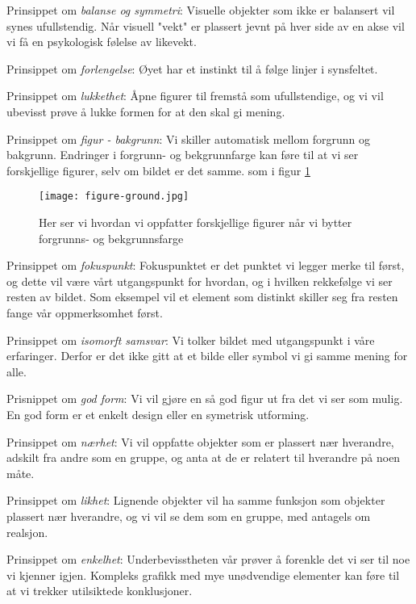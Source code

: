 \noindent
Prinsippet om \emph{balanse og symmetri}: Visuelle objekter som ikke er balansert vil synes ufullstendig. Når visuell "vekt" er plassert jevnt på hver side av en akse vil vi få en psykologisk følelse av likevekt.

\noindent
Prinsippet om \emph{forlengelse}: Øyet har et instinkt til å følge linjer i synsfeltet.

\noindent
Prinsippet om \emph{lukkethet}: Åpne figurer til fremstå som ufullstendige, og vi vil ubevisst prøve å lukke formen for at den skal gi mening.

\noindent
Prinsippet om \emph{figur - bakgrunn}: Vi skiller automatisk mellom forgrunn og bakgrunn. Endringer i forgrunn- og bekgrunnfarge kan føre til at vi ser forskjellige figurer, selv om bildet er det samme. som i figur \ref{forgrunn_bakgrunn}

\begin{figure}
\centering
\texttt{[image: figure-ground.jpg]}
\caption{Her ser vi hvordan vi oppfatter forskjellige figurer når vi bytter forgrunns- og bekgrunnsfarge}
\label{forgrunn_bakgrunn}
\end{figure}

\noindent
Prinsippet om \emph{fokuspunkt}: Fokuspunktet er det punktet vi legger merke til først, og dette vil være vårt utgangspunkt for hvordan, og i hvilken rekkefølge vi ser resten av bildet. Som eksempel vil et element som distinkt skiller seg fra resten fange vår oppmerksomhet først.

\noindent
Prinsippet om \emph{isomorft samsvar}: Vi tolker bildet med utgangspunkt i våre erfaringer. Derfor er det ikke gitt at et bilde eller symbol vi gi samme mening for alle.

\noindent
Prisnippet om \emph{god form}: Vi vil gjøre en så god figur ut fra det vi ser som mulig. En god form er et enkelt design eller en symetrisk utforming.

\noindent
Prinsippet om \emph{nærhet}: Vi vil oppfatte objekter som er plassert nær hverandre, adskilt fra andre som en gruppe, og anta at de er relatert til hverandre på noen måte.

\noindent
Prinsippet om \emph{likhet}: Lignende objekter vil ha samme funksjon som objekter plassert nær hverandre, og vi vil se dem som en gruppe, med antagels om realsjon.

\noindent
Prinsippet om \emph{enkelhet}: Underbevisstheten vår prøver å forenkle det vi ser til noe vi kjenner igjen. Kompleks grafikk med mye unødvendige elementer kan føre til at vi trekker utilsiktede konklusjoner.

